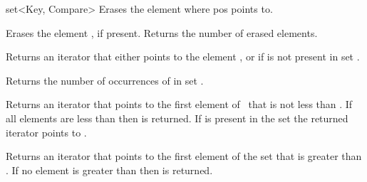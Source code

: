 \begin{ccClassTemplate} {set<Key, Compare>}
{Erases the element where pos points to.}

{Erases the element , if present. Returns the number
 of erased elements.}


{Returns an iterator that either points to the element ,
 or  if  is not present in set \ccVar.}

{Returns the number of occurrences of  in set \ccVar.}


{Returns an iterator that points to the first element of \ccVar\ 
that is not less than . If all elements are less than
 then \ccStyle{end()} is returned. If 
is present in the set the returned iterator points to \ccStyle{k}.}

{Returns an iterator that points to the first element of the set
that is greater than . If no element is greater than
\ccStyle{k} then  is returned.}

\end{ccClassTemplate} 
